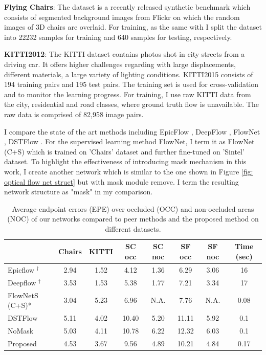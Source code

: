 \documentclass{iitthesis}
\begin{document}
\noindent \textbf{Flying Chairs}: The dataset \cite{DFIB15} is a recently released synthetic benchmark which consists of segmented background images from Flickr on which the random images of 3D chairs are overlaid. For training, as the same with \cite{DFIB15} I split the dataset into 22232 samples for training and 640 samples for testing, respectively.

\noindent \textbf{KITTI2012}: The KITTI dataset \cite{Geiger2012CVPR} contains photos shot in city streets from a driving car. It offers higher challenges regarding with large displacements, different materials, a large variety of lighting conditions. KITTI2015 consists of 194 training pairs and 195 test pairs. The training set is used for cross-validation and to monitor the learning progress. For training, I use raw KITTI data from the city, residential and road classes, where ground truth flow is unavailable. The raw data is comprised of 82,958 image pairs. 

I compare the state of the art methods including EpicFlow \cite{revaud2015epicflow}, DeepFlow \cite{weinzaepfel2013deepflow}, FlowNet \cite{reed2016generative}, DSTFlow \cite{ren2017unsupervised}. For the supervised learning method FlowNet, I term it as FlowNet (C+S) which is trained on 'Chairs' dataset and further fine-tuned on 'Sintel' dataset. To highlight the effectiveness of introducing mask mechanism in this work, I create another network which is similar to the one shown in Figure \ref{fig: optical flow net struct} but with mask module remove. I term the resulting network structure as "mask" in my comparison.

\begin{table}[]
\centering
\caption{Average endpoint errors (EPE) over occluded (OCC) and non-occluded areas (NOC) of our networks compared to peer methods and the proposed method on different datasets. }
\label{tab: optical flow comparison}
\begin{tabular}{lccccccc}
\hline
\hline
 & Chairs & KITTI & SC occ & SC noc & SF occ & SF noc & Time (sec)\\ \hline
Epicflow $^\dagger$ & 2.94 & 1.52 & 4.12 & 1.36 & 6.29 & 3.06 & 16\\
Deepflow $^\dagger$ & 3.53 & 1.53 & 5.38 & 1.77 & 7.21 & 3.34 & 17\\
FlowNetS (C+S)* & 3.04 & 5.23 & 6.96 & N.A. & 7.76 & N.A. & 0.08\\
DSTFlow & 5.11 & 4.02 & 10.40 & 5.20 & 11.11 & 5.92 & 0.1\\
NoMask & 5.03 & 4.11 & 10.78 & 6.22 & 12.32 & 6.03 & 0.1\\
Proposed & 4.53 & 3.67 & 9.56 & 4.89 & 10.21 & 4.84 & 0.17\\ \hline
\end{tabular}
\end{table}
\end{document}
